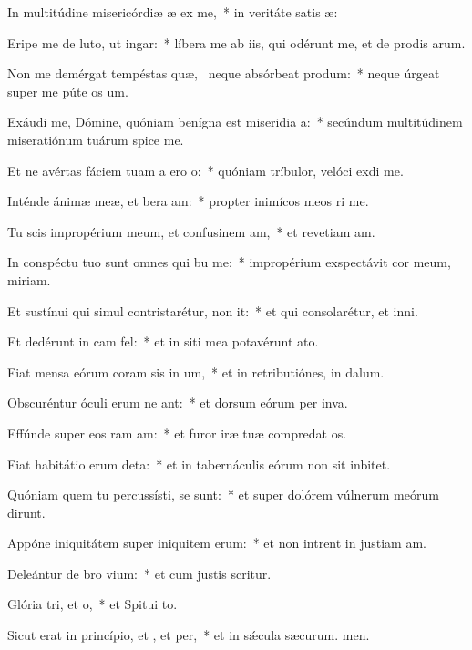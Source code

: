 \item In multitúdine misericórdiæ æ ex me,~* in veritáte satis æ:
\item Eripe me de luto, ut  ingar:~* líbera me ab iis, qui odérunt me, et de prodis arum.
\item Non me demérgat tempéstas quæ,~\pscross{} neque absórbeat  produm:~* neque úrgeat super me púte os um.
\item Exáudi me, Dómine, quóniam benígna est miseridia a:~* secúndum multitúdinem miseratiónum tuárum spice  me.
\item Et ne avértas fáciem tuam a ero o:~* quóniam tríbulor, velóci exdi me.
\item Inténde ánimæ meæ, et bera am:~* propter inimícos meos ri me.
\item Tu scis impropérium meum, et confusinem am,~* et revetiam am.
\item In conspéctu tuo sunt omnes qui bu me:~* impropérium exspectávit cor meum,  miriam.
\item Et sustínui qui simul contristarétur,  non it:~* et qui consolarétur, et  inni.
\item Et dedérunt in cam  fel:~* et in siti mea potavérunt  ato.
\item Fiat mensa eórum coram sis in um,~* et in retributiónes,  in dalum.
\item Obscuréntur óculi erum ne ant:~* et dorsum eórum per inva.
\item Effúnde super eos ram am:~* et furor iræ tuæ compredat os.
\item Fiat habitátio erum deta:~* et in tabernáculis eórum non sit  inbitet.
\item Quóniam quem tu percussísti, se sunt:~* et super dolórem vúlnerum meórum dirunt.
\item Appóne iniquitátem super iniquitem erum:~* et non intrent in justiam am.
\item Deleántur de bro vium:~* et cum justis  scritur.
\item Glória tri, et o,~* et Spitui to.
\item Sicut erat in princípio, et , et per,~* et in sǽcula sæcurum. men.
